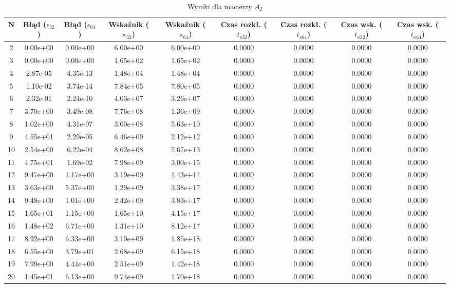 \begin{table}[htbp]
\centering
\caption{Wyniki dla macierzy $A_I$ \label{tab:table_A_I}}
\begin{tabular}{ccccccccc}
\toprule
N & Błąd ($\epsilon_{32}$) & Błąd ($\epsilon_{64}$) & Wskaźnik ($\kappa_{32}$) & Wskaźnik ($\kappa_{64}$) & Czas rozkł. ($t_{s32}$) & Czas rozkł. ($t_{s64}$) & Czas wsk. ($t_{\kappa32}$) & Czas wsk. ($t_{\kappa64}$) \\
\midrule
2 & 0.00e+00 & 0.00e+00 & 6.00e+00 & 6.00e+00 & 0.0000 & 0.0000 & 0.0000 & 0.0000 \\
3 & 0.00e+00 & 0.00e+00 & 1.65e+02 & 1.65e+02 & 0.0000 & 0.0000 & 0.0000 & 0.0000 \\
4 & 2.87e-05 & 4.35e-13 & 1.48e+04 & 1.48e+04 & 0.0000 & 0.0000 & 0.0000 & 0.0000 \\
5 & 1.10e-02 & 3.74e-14 & 7.84e+05 & 7.80e+05 & 0.0000 & 0.0000 & 0.0000 & 0.0000 \\
6 & 2.32e-01 & 2.24e-10 & 4.03e+07 & 3.26e+07 & 0.0000 & 0.0000 & 0.0000 & 0.0000 \\
7 & 3.70e+00 & 3.49e-08 & 7.76e+08 & 1.36e+09 & 0.0000 & 0.0000 & 0.0000 & 0.0000 \\
8 & 1.02e+00 & 4.31e-07 & 3.00e+08 & 5.63e+10 & 0.0000 & 0.0000 & 0.0000 & 0.0000 \\
9 & 4.55e+01 & 2.29e-05 & 6.46e+09 & 2.12e+12 & 0.0000 & 0.0000 & 0.0000 & 0.0000 \\
10 & 2.54e+00 & 6.22e-04 & 8.62e+08 & 7.67e+13 & 0.0000 & 0.0000 & 0.0000 & 0.0000 \\
11 & 4.75e+01 & 1.69e-02 & 7.98e+09 & 3.00e+15 & 0.0000 & 0.0000 & 0.0000 & 0.0000 \\
12 & 9.47e+00 & 1.17e+00 & 3.19e+09 & 1.43e+17 & 0.0000 & 0.0000 & 0.0000 & 0.0000 \\
13 & 3.63e+00 & 5.37e+00 & 1.29e+09 & 3.38e+17 & 0.0000 & 0.0000 & 0.0000 & 0.0000 \\
14 & 9.48e+00 & 1.01e+00 & 2.42e+09 & 3.83e+17 & 0.0000 & 0.0000 & 0.0000 & 0.0000 \\
15 & 1.65e+01 & 1.15e+00 & 1.65e+10 & 4.15e+17 & 0.0000 & 0.0000 & 0.0000 & 0.0000 \\
16 & 1.48e+02 & 6.71e+00 & 1.31e+10 & 8.12e+17 & 0.0000 & 0.0000 & 0.0000 & 0.0000 \\
17 & 8.92e+00 & 6.33e+00 & 3.10e+09 & 1.85e+18 & 0.0000 & 0.0000 & 0.0000 & 0.0000 \\
18 & 6.55e+00 & 3.79e+01 & 2.68e+09 & 6.15e+18 & 0.0000 & 0.0000 & 0.0000 & 0.0000 \\
19 & 7.99e+00 & 4.44e+00 & 2.51e+09 & 1.42e+18 & 0.0000 & 0.0000 & 0.0000 & 0.0000 \\
20 & 1.45e+01 & 6.13e+00 & 9.74e+09 & 1.70e+18 & 0.0000 & 0.0000 & 0.0000 & 0.0000 \\
\bottomrule
\end{tabular}
\end{table}
